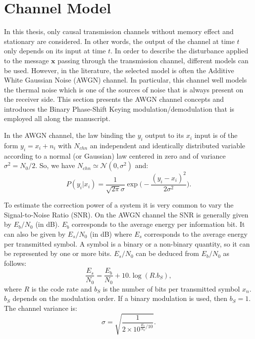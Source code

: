 \section{Channel Model}

In this thesis, only causal transmission channels without memory effect and
stationary are considered. In other words, the output of the channel at time $t$
only depends on its input at time $t$. In order to describe the disturbance
applied to the message $\bm{x}$ passing through the transmission channel,
different models can be used. However, in the literature, the selected model is
often the Additive White Gaussian Noise (AWGN) channel. In particular, this
channel well models the thermal noise which is one of the sources of noise
that is always present on the receiver side. This section presents the AWGN
channel concepts and introduces the Binary Phase-Shift Keying
modulation/demodulation that is employed all along the manuscript.

In the AWGN channel, the law binding the $y_i$ output to its $x_i$ input is of
the form $y_i = x_i + n_i$ with $N_{chn}$ an independent and identically
distributed variable according to a normal (or Gaussian) law centered in zero
and of variance $\sigma^2 = N_0 / 2$. So, we have $N_{chn} \simeq \mathcal{N}(0,
\sigma^2)$ and:
\begin{equation}
P(y_i|x_i) = \frac{1}{\sqrt{2\pi}\sigma}\exp{\Big(-\frac{(y_i-x_i)^2}{2\sigma^2}\Big)}.
\end{equation}

To estimate the correction power of a system it is very common to vary the
Signal-to-Noise Ratio (SNR). On the AWGN channel the SNR is generally given by
$E_b/N_0$ (in dB). $E_b$ corresponds to the average energy per information bit.
It can also be given by $E_s/N_0$ (in dB) where $E_s$ corresponds to the average
energy per transmitted symbol. A symbol is a binary or a non-binary quantity, so
it can be represented by one or more bits. $E_s/N_0$ can be deduced from
$E_b/N_0$ as follows:
\begin{equation}
\frac{E_s}{N_0} = \frac{E_b}{N_0} + 10.\log{(R.b_S)},
\end{equation}
where $R$ is the code rate and $b_S$ is the number of bits per transmitted
symbol $x_n$. $b_S$ depends on the modulation order. If a binary modulation is
used, then $b_S = 1$. The channel variance is:
\begin{equation}
\sigma = \sqrt{\frac{1}{2 \times 10^{\frac{E_s}{N_0} / 10}}}.
\end{equation}

